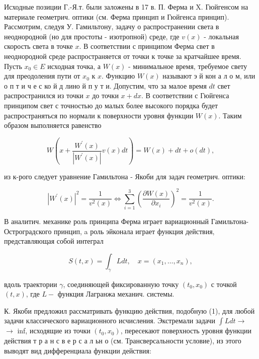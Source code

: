 \documentclass[10pt]{article}
\begin{document}
Исходные позиции Г.-Я.т. были заложены в 17 в. П. Ферма и X. Гюйгенсом на материале геометрич. оптики (см. Ферма принцип и Гюйгенса принцип). Рассмотрим, следуя У. Гамильтону, задачу о распространении света в неоднородной (но для простоты - изотропной) среде, где $v(x)$ - локальная скорость света в точке $x$. В соответствии с принципом Ферма свет в неоднородной среде распространяется от точки к точке за кратчайшее время. Пусть $x_{0} \in E$ исходная точка, а $W(x)$ - минимальное время, требуемое свету для преодоления пути от $x_{0}$ к $x$. Функцию $W(x)$ называют э й кон а л о м, или о п т и ч е с ко й д лино й п у т и. Допустим, что за малое время $d t$ свет распространился из точки $x$ до точки $x+d x$. В соответствии с Гюйгенса принципом свет с точностью до малых более высокого порядка будет распространяться по нормали к поверхности уровня функции $W(x)$. Таким образом выполняется равенство



\[

W\left(x+\frac{W^{\prime}(x)}{\left|W^{\prime}(x)\right|} v(x) d t\right)=W(x)+d t+o(d t),

\]



из к-рого следует уравнение Гамильтона - Якоби для задач геометрич. оптики:



\[

\left|W^{\prime}(x)\right|^{2}=\frac{1}{v^{2}(x)} \Leftrightarrow \sum_{i=1}^{3}\left(\frac{\partial W(x)}{\partial x_{i}}\right)^{2}=\frac{1}{v^{2}(x)} .

\]



В аналитич. механике роль принципа Ферма играет вариационный Гамильтона-Остроградского принцип, a роль эйконала играет функция действия, представляющая собой интеграл



\[

S(t, x)=\int_{\gamma} L d t, \quad x=\left(x_{1}, \ldots, x_{n}\right),

\]



вдоль траектории $\gamma$, соединяющей фиксированную точку $\left(t_{0}, x_{0}\right)$ с точкой $(t, x)$, где $L-$ функция Лагранжа механич. системы.



К. Якоби предложил рассматривать функцию действия, подобную (1), для любой задачи классического вариационного исчисления. Экстремали задачи $\int L d t \rightarrow$ $\rightarrow$ inf, исходящие из точки $\left(t_{0}, x_{0}\right)$, пересекают поверхность уровня функции действия т р а н с в е р с а л ьн о (см. Трансверсальности условие), из этого выводят вид дифференциала функции действия:
\end{document}
